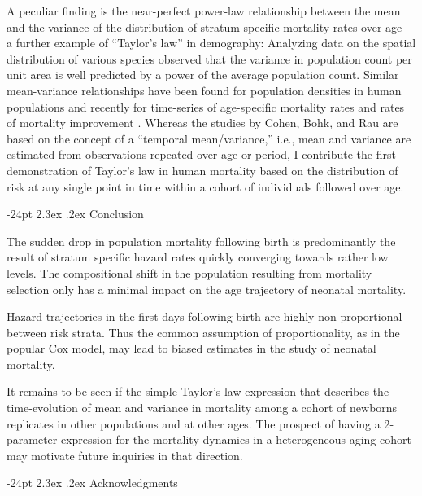 \documentclass[10pt,twoside,reqno]{article}
\makeatletter
\renewcommand\section{\@startsection {section}{1}{\z@}%
                                   {-24pt}%
                                   {2.3ex \@plus.2ex}%
                                   {\normalfont\large\bfseries}}
\makeatother
\begin{document}
A peculiar finding is the near-perfect power-law relationship between the mean and the variance of the distribution of stratum-specific mortality rates over age -- a further example of ``Taylor's law'' in demography: Analyzing data on the spatial distribution of various species \citet{Taylor1961} observed that the variance in population count per unit area is well predicted by a power of the average population count. Similar mean-variance relationships have been found for population densities in human populations \citep{Cohen2013, Naccarato2018} and recently for time-series of age-specific mortality rates and rates of mortality improvement \citep{Bohk2015, Cohen2018}. Whereas the studies by Cohen, Bohk, and Rau are based on the concept of a ``temporal mean/variance,'' i.e., mean and variance are estimated from observations repeated over age or period, I contribute the first demonstration of Taylor's law in human mortality based on the distribution of risk at any single point in time within a cohort of individuals followed over age.

\section{Conclusion}\label{conclusion}

The sudden drop in population mortality following birth is predominantly the result of stratum specific hazard rates quickly converging towards rather low levels. The compositional shift in the population resulting from mortality selection only has a minimal impact on the age trajectory of neonatal mortality.

Hazard trajectories in the first days following birth are highly non-proportional between risk strata. Thus the common assumption of proportionality, as in the popular Cox model, may lead to biased estimates in the study of neonatal mortality.

It remains to be seen if the simple Taylor's law expression that describes the time-evolution of mean and variance in mortality among a cohort of newborns replicates in other populations and at other ages. The prospect of having a 2-parameter expression for the mortality dynamics in a heterogeneous aging cohort may motivate future inquiries in that direction.

\section{Acknowledgments}\label{acknowledgments}
\end{document}
